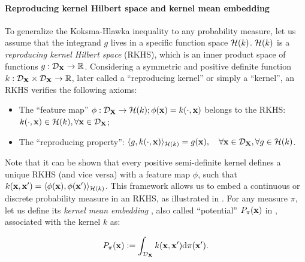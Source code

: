 \paragraph{Reproducing kernel Hilbert space and kernel mean embedding}
To generalize the Koksma-Hlawka inequality to any probability measure, let us assume that the integrand $g$ lives in a specific function space $\mathcal{H}(k)$. $\mathcal{H}(k)$ is a \emph{reproducing kernel Hilbert space} (RKHS), which is an inner product space of functions $g:\mathcal{D}_{{\bf X}} \rightarrow \mathbb{R}$. 
Considering a symmetric and positive definite function $k: \mathcal{D}_{{\bf X}} \times \mathcal{D}_{{\bf X}} \rightarrow \mathbb{R}$, later called a ``reproducing kernel'' or simply a ``kernel'', an RKHS verifies the following axioms: 
\begin{itemize}
    \item The ``feature map'' $\phi : \mathcal{D}_{{\bf X}} \to \mathcal{H}(k); \phi({\bf x}) = k(\cdot, {\bf x})$ belongs to the RKHS: $k(\cdot, {\bf x}) \in \mathcal{H}(k), \forall {\bf x} \in \mathcal{D}_{{\bf X}}$;
    \item The ``reproducing property'': $\langle g, k(\cdot, {\bf x}) \rangle_{\mathcal{H}(k)} = g({\bf x}), \quad \forall {\bf x} \in \mathcal{D}_{{\bf X}}, \forall g \in \mathcal{H}(k)$.
\end{itemize}
Note that it can be shown that every positive semi-definite kernel defines a unique RKHS (and vice versa) with a feature map $\phi$, such that $k({\bf x}, {\bf x}') = \langle \phi({\bf x}), \phi({\bf x}') \rangle_{\mathcal{H}(k)}$.
This framework allows us to embed a continuous or discrete probability measure in an RKHS, as illustrated in . 
For any measure $\pi$, let us define its \emph{kernel mean embedding} \citep{sejdinovic_2013}, also called ``potential'' $P_{\pi}({\bf x})$ in \cite{pronzato_zhigljavsky_2020}, associated with the kernel $k$ as:

\begin{equation}
   P_{\pi}({\bf x}) := \int_{\mathcal{D}_{{\bf X}}} k({\bf x}, {\bf x}') \mathrm{d} \pi({\bf x}').
\end{equation}

